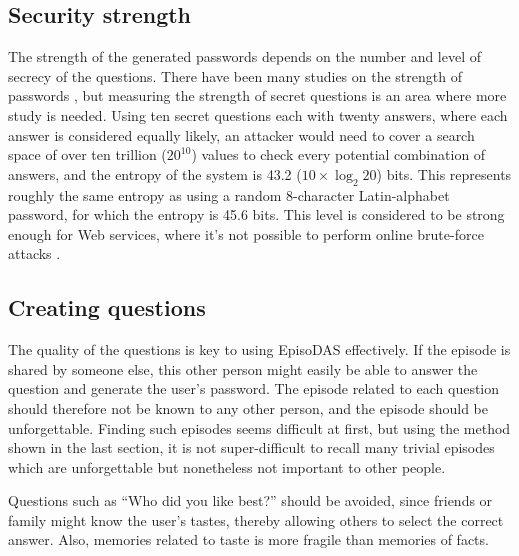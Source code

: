 \documentclass[sigconf]{acmart}
\begin{document}
\subsection{Security strength}

The strength of the generated passwords depends on the number and 
level of secrecy of the questions.
%
There have been many studies on the strength of passwords
\cite{Hayashi:2011:DSP:1978942.1979326,Komanduri:2011:PPM:1978942.1979321}, %
but measuring the strength of secret questions is an area where more study is needed.
Using ten secret questions each with twenty answers, where each answer is considered equally likely,
an attacker would need to cover a search space of over ten trillion ($20^{10}$) values to check
every potential combination of answers,
and the entropy of the system is 43.2 ($10 \times \log_2 20$) bits.  %
%
This represents roughly the same entropy as using a random 8-character Latin-alphabet
password, for which the entropy is 45.6 bits.
This level is considered to be strong enough for Web services,
where it's not possible to perform online brute-force attacks \cite{Florencio:2007:SWP:1361419.1361429}.
  
\subsection{Creating questions}

The quality of the questions is key to using EpisoDAS effectively.  If
the episode is shared by someone else, this other person might easily
be able to answer the question and generate the user's password.
%
The episode related to each question should therefore not be known to any other person,
and the episode should be unforgettable.
%
Finding such episodes seems difficult at first,
but using the method shown in the last section,
it is not super-difficult to recall
many trivial episodes which are unforgettable but
nonetheless not important to other people.

Questions such as ``Who did you like best?'' should be avoided,
since friends or family might know the user's tastes, thereby allowing 
others to select the correct answer.
Also, memories related to taste is more fragile than memories of facts.

% 
\end{document}
